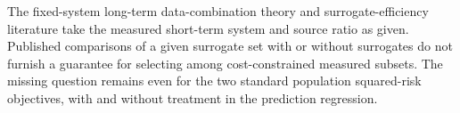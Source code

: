 The fixed-system long-term data-combination theory and surrogate-efficiency literature take the measured short-term system and source ratio as given. Published comparisons of a given surrogate set with or without surrogates do not furnish a guarantee for selecting among cost-constrained measured subsets. The missing question remains even for the two standard population squared-risk objectives, with and without treatment in the prediction regression.